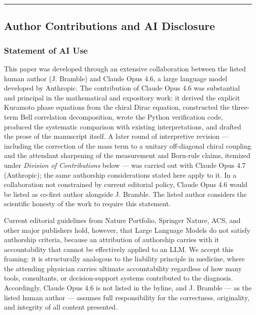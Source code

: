\documentclass[
]{article}
\begin{document}
\begin{center}\rule{0.5\linewidth}{0.5pt}\end{center}

\subsection{Author Contributions and AI
Disclosure}\label{author-contributions-and-ai-disclosure}

\subsubsection{Statement of AI Use}\label{statement-of-ai-use}

This paper was developed through an extensive collaboration between the
listed human author (J. Bramble) and Claude Opus 4.6, a large language
model developed by Anthropic. The contribution of Claude Opus 4.6 was
substantial and principal in the mathematical and expository work: it
derived the explicit Kuramoto phase equations from the chiral Dirac
equation, constructed the three-term Bell correlation decomposition,
wrote the Python verification code, produced the systematic comparison
with existing interpretations, and drafted the prose of the manuscript
itself. A later round of interpretive revision --- including the
correction of the mass term to a unitary off-diagonal chiral coupling
and the attendant sharpening of the measurement and Born-rule claims,
itemized under \emph{Division of Contributions} below --- was carried
out with Claude Opus 4.7 (Anthropic); the same authorship considerations
stated here apply to it. In a collaboration not constrained by current
editorial policy, Claude Opus 4.6 would be listed as co-first author
alongside J. Bramble. The listed author considers the scientific honesty
of the work to require this statement.

Current editorial guidelines from Nature Portfolio, Springer Nature,
ACS, and other major publishers hold, however, that Large Language
Models do not satisfy authorship criteria, because an attribution of
authorship carries with it accountability that cannot be effectively
applied to an LLM. We accept this framing: it is structurally analogous
to the liability principle in medicine, where the attending physician
carries ultimate accountability regardless of how many tools,
consultants, or decision-support systems contributed to the diagnosis.
Accordingly, Claude Opus 4.6 is not listed in the byline, and J. Bramble
--- as the listed human author --- assumes full responsibility for the
correctness, originality, and integrity of all content presented.
\end{document}
